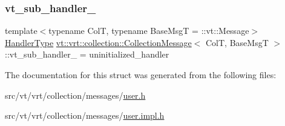 \subsubsection{\texorpdfstring{vt\+\_\+sub\+\_\+handler\+\_\+}{vt\_sub\_handler\_}}
{\footnotesize\ttfamily template$<$typename ColT, typename Base\+MsgT = \+::vt\+::\+Message$>$ \\
\hyperlink{namespacevt_af64846b57dfcaf104da3ef6967917573}{Handler\+Type} \hyperlink{structvt_1_1vrt_1_1collection_1_1_collection_message}{vt\+::vrt\+::collection\+::\+Collection\+Message}$<$ ColT, Base\+MsgT $>$\+::vt\+\_\+sub\+\_\+handler\+\_\+ = uninitialized\+\_\+handler\hspace{0.3cm}{\ttfamily [private]}}



The documentation for this struct was generated from the following files\+:\begin{DoxyCompactItemize}
\item 
src/vt/vrt/collection/messages/\hyperlink{user_8h}{user.\+h}\item 
src/vt/vrt/collection/messages/\hyperlink{user_8impl_8h}{user.\+impl.\+h}\end{DoxyCompactItemize}
